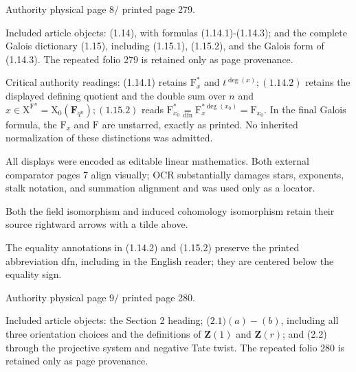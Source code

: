 \documentclass[10pt,leqno]{article}
\begin{document}
\clearpage

\label{physical-8}\par\smallskip

\noindent Authority physical page \(8 /\) printed page 279.\par

\noindent Included article objects: (1.14), with formulas (1.14.1)-(1.14.3); and the complete Galois dictionary (1.15), including (1.15.1), (1.15.2), and the Galois form of (1.14.3). The repeated folio 279 is retained only as page provenance.\par

\noindent Critical authority readings: (1.14.1) retains \(\mathrm{F}_{x}^{*}\) and \(t^{\operatorname{deg}(x)}; (1.14.2)\) retains the displayed defining quotient and the double sum over \(n\) and \(x\in \mathrm{X}^{\mathrm{F}^{n}}=\mathrm{X}_{0}(\mathbf{F}_{q^{n}}); (1.15.2)\) reads \(\mathrm{F}_{x_{0}}^{*}\underset{\mathrm{dfn}}{=}\mathrm{F}_{x}^{*\operatorname{deg}(x_{0})}=\mathrm{F}_{x_{0}}\). In the final Galois formula, the \(\mathrm{F}_{x}\) and \(\mathrm{F}\) are unstarred, exactly as printed. No inherited normalization of these distinctions was admitted.\par

\noindent All displays were encoded as editable linear mathematics. Both external comparator pages 7 align visually; OCR substantially damages stars, exponents, stalk notation, and summation alignment and was used only as a locator.\par

\noindent Both the field isomorphism and induced cohomology isomorphism retain their source rightward arrows with a tilde above.\par

\noindent The equality annotations in (1.14.2) and (1.15.2) preserve the printed abbreviation dfn, including in the English reader; they are centered below the equality sign.\par

\clearpage

\label{physical-9}\par\smallskip

\noindent Authority physical page \(9 /\) printed page 280.\par

\noindent Included article objects: the Section 2 heading; (\(2.1)(a)-(b)\), including all three orientation choices and the definitions of \(\mathbf{Z}(1)\) and \(\mathbf{Z}(r)\); and (2.2) through the projective system and negative Tate twist. The repeated folio 280 is retained only as page provenance.\par
\end{document}
